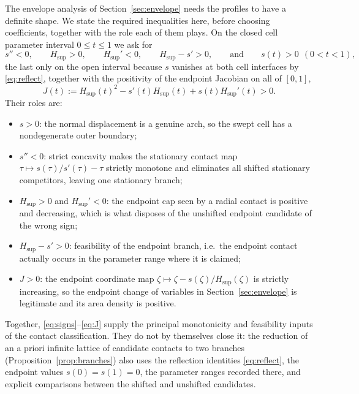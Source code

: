 \documentclass[11pt]{article}
\theoremstyle{plain}
\theoremstyle{definition}
\theoremstyle{remark}
\newcommand{\Hsup}{H_{\mathrm{sup}}}
\begin{document}
The envelope analysis of Section~\ref{sec:envelope} needs the profiles to have a
definite shape. We state the required inequalities here, before choosing
coefficients, together with the role each of them plays. On the closed cell
parameter interval $0\le t\le1$ we ask for
\begin{equation}\label{eq:signs}
  s''<0,\qquad \Hsup>0,\qquad \Hsup'<0,\qquad \Hsup-s'>0,
  \qquad\text{and}\qquad s(t)>0\ \ (0<t<1),
\end{equation}
the last only on the open interval because $s$ vanishes at both cell
interfaces by \eqref{eq:reflect}, together with the positivity of the endpoint
Jacobian on all of $[0,1]$,
\begin{equation}\label{eq:J}
  J(t):=\Hsup(t)^{2}-s'(t)\Hsup(t)+s(t)\Hsup'(t)>0 .
\end{equation}
Their roles are:
\begin{itemize}
  \item $s>0$: the normal displacement is a genuine arch, so the swept cell has
    a nondegenerate outer boundary;
  \item $s''<0$: strict concavity makes the stationary contact map
    $\tau\mapsto s(\tau)/s'(\tau)-\tau$ strictly monotone and eliminates all
    shifted stationary competitors, leaving one stationary branch;
  \item $\Hsup>0$ and $\Hsup'<0$: the endpoint cap seen by a radial contact is positive
    and decreasing, which is what disposes of the unshifted endpoint candidate
    of the wrong sign;
  \item $\Hsup-s'>0$: feasibility of the endpoint branch, i.e.\ the endpoint contact
    actually occurs in the parameter range where it is claimed;
  \item $J>0$: the endpoint coordinate map $\zeta\mapsto\zeta-s(\zeta)/\Hsup(\zeta)$
    is strictly increasing, so the endpoint change of variables in
    Section~\ref{sec:envelope} is legitimate and its area density is positive.
\end{itemize}
Together, \eqref{eq:signs}--\eqref{eq:J} supply the principal monotonicity and
feasibility inputs of the contact classification. They do not by themselves
close it: the reduction of an a priori infinite lattice of candidate contacts to
two branches (Proposition~\ref{prop:branches}) also uses the reflection
identities \eqref{eq:reflect}, the endpoint values $s(0)=s(1)=0$, the parameter
ranges recorded there, and explicit comparisons between the shifted and
unshifted candidates.
\end{document}

